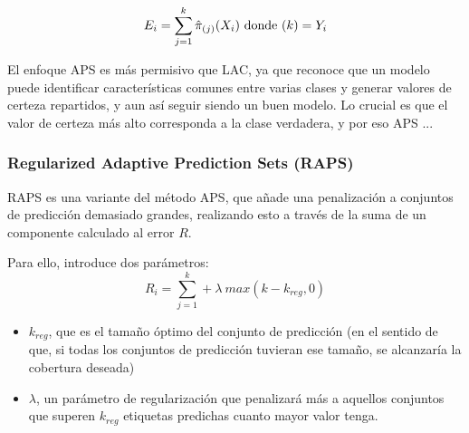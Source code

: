 $$
E_i=\sum_{j=1}^{k} \hat{\pi}_{(j)}(X_i) \textnormal{ donde } (k)=Y_i
$$


El enfoque APS es más permisivo que LAC, ya que reconoce que un modelo puede identificar características 
comunes entre varias clases y generar valores de certeza repartidos, y aun así seguir siendo un buen modelo. 
Lo crucial es que el valor de certeza más alto corresponda a la clase verdadera, y por eso APS ...





\subsubsection{Regularized Adaptive Prediction Sets (RAPS)}

RAPS \cite{angelopoulos2020} es una variante del método APS, que añade una penalización a conjuntos de 
predicción demasiado grandes, realizando esto a través de la suma de un componente calculado al error $R$.

Para ello, introduce dos parámetros:
$$
R_i = \sum_{j=1}^{k}{} + \lambda \ max(k-k_{reg},0)
$$

\begin{itemize}
    \item $k_{reg}$, que es el tamaño óptimo del conjunto de predicción (en el sentido de que, si todas los 
    conjuntos de predicción tuvieran ese tamaño, se alcanzaría la cobertura deseada)
    \item $\lambda$, un parámetro de regularización que penalizará más a aquellos conjuntos que superen 
    $k_{reg}$ etiquetas predichas cuanto mayor valor tenga.
\end{itemize}












